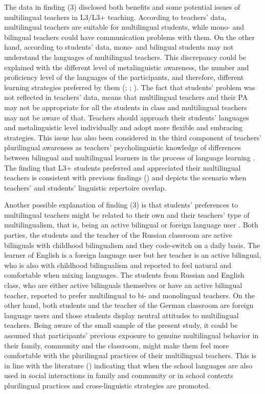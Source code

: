 \documentclass[output=paper]{../langscibook}
\begin{document}
The data in finding (3) disclosed both benefits and some potential issues of multilingual teachers in L3/L3+ teaching. According to teachers’ data, multilingual teachers are suitable for multilingual students, while mono- and bilingual teachers could have communication problems with them. On the other hand, according to students’ data, mono- and bilingual students may not understand the languages of multilingual teachers. This discrepancy could be explained with the different level of metalinguistic awareness, the number and proficiency level of the languages of the participants, and therefore, different learning strategies preferred by them (\citealt{Cenoz2013b}; \citealt{JessnerEtAl2016}; \citealt{Dmitrenko2017}). The fact that students’ problem was not reflected in teachers’ data, means that multilingual teachers and their PA may not be appropriate for all the students in class and multilingual teachers may not be aware of that. Teachers should approach their students’ languages and metalinguistic level individually and adopt more flexible and embracing strategies. This issue has also been considered in the third component of teachers’ plurilingual awareness as teachers’ psycholinguistic knowledge of differences between bilingual and multilingual learners in the process of language learning \citep{Otwinowska2014}. The finding that L3+ students preferred and appreciated their multilingual teachers is consistent with previous findings (\citealt{AroninOLaoire2003}) and depicts the scenario when teachers’ and students’ linguistic repertoire overlap.

Another possible explanation of finding (3) is that students’ preferences to multilingual teachers might be related to their own and their teachers’ type of multilingualism, that is, being an active bilingual or foreign language user \citep[82]{Cenoz2013b}. Both parties, the students and the teacher of the Russian classroom are active bilinguals with childhood bilingualism and they code-switch on a daily basis. The learner of English is a foreign language user but her teacher is an active bilingual, who is also with childhood bilingualism and reported to feel natural and comfortable when mixing languages. The students from Russian and English class, who are either active bilinguals themselves or have an active bilingual teacher, reported to prefer multilingual to bi- and monolingual teachers. On the other hand, both students and the teacher of the German classroom are foreign language users and those students display neutral attitudes to multilingual teachers. Being aware of the small sample of the present study, it could be assumed that participants’ previous exposure to genuine multilingual behavior in their family, community and the classroom, might make them feel more comfortable with the plurilingual practices of their multilingual teachers. This is in line with the literature (\citealt{BonoStratilaki2009}) indicating that when the school languages are also used in social interactions in family and community or in school contexts plurilingual practices and cross-linguistic strategies are promoted.
\end{document}
